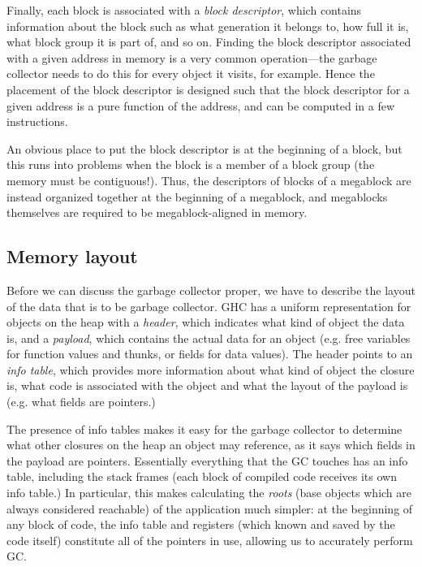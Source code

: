 Finally, each block is associated with a \emph{block descriptor}, which
contains information about the block such as what generation it belongs to, how full it is, what block
group it is part of, and so on.  Finding the block descriptor
associated with a given address in memory is a very common
operation---the garbage collector needs to do this for every object it
visits, for example.  Hence the placement of the block descriptor is
designed such that the block descriptor for a given address is a pure function
of the address, and can be computed in a few instructions.

An obvious place to put the block descriptor is at the beginning of a
block, but this runs into problems when the block is a member of a
block group (the memory must be contiguous!).  Thus, the descriptors
of blocks of a megablock are instead organized together at the
beginning of a megablock, and megablocks themselves are required to be
megablock-aligned in memory.

\subsection{Memory layout}


Before we can discuss the garbage collector proper, we have to describe
the layout of the data that is to be garbage collector.  GHC has a uniform
representation for objects on the heap with a \emph{header}, which indicates
what kind of object the data is, and a \emph{payload}, which contains
the actual data for an object (e.g. free variables for function values
and thunks, or fields for data values).  The header points to an
\emph{info table}, which provides more information about what kind of
object the closure is, what code is associated with the object and what
the layout of the payload is (e.g. what fields are pointers.)

The presence of info tables makes it easy for the garbage collector to
determine what other closures on the heap an object may reference, as it
says which fields in the payload are pointers.  Essentially everything
that the GC touches has an info table, including the stack frames (each
block of compiled code receives its own info table.)  In particular,
this makes calculating the \emph{roots} (base objects which are always
considered reachable) of the application much simpler: at the beginning
of any block of code, the info table and registers (which known and
saved by the code itself) constitute all of the pointers in use,
allowing us to accurately perform GC.

